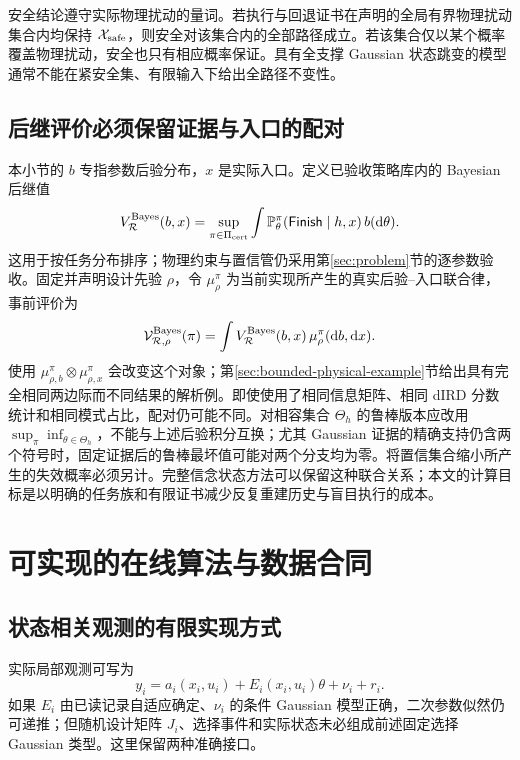\documentclass[UTF8,fontset=fandol,zihao=5,a4paper]{ctexart}
\newcommand{\dd}{\mathrm d}\newcommand{\given}{\,|\,}
\theoremstyle{definition}
\theoremstyle{remark}\newtheorem{remark}[theorem]{说明}
\numberwithin{equation}{section}
\begin{document}
安全结论遵守实际物理扰动的量词。若执行与回退证书在声明的全局有界物理扰动集合内均保持 $\mathcal X_{\rm safe}$，则安全对该集合内的全部路径成立。若该集合仅以某个概率覆盖物理扰动，安全也只有相应概率保证。具有全支撑 Gaussian 状态跳变的模型通常不能在紧安全集、有限输入下给出全路径不变性。

\subsection{后继评价必须保留证据与入口的配对}
本小节的 $b$ 专指参数后验分布，$x$ 是实际入口。定义已验收策略库内的 Bayesian 后继值
\begin{equation}
V_{\mathcal R}^{\rm Bayes}(b,x)
=\sup_{\pi\in\Pi_{\rm cert}}
\int \Pp_\theta^\pi(\mathsf{Finish}\mid h,x)\,b(\dd\theta).
\end{equation}
这用于按任务分布排序；物理约束与置信管仍采用第\ref{sec:problem}节的逐参数验收。固定并声明设计先验 $\rho$，令 $\mu_\rho^\pi$ 为当前实现所产生的真实后验--入口联合律，事前评价为
\begin{equation}
\mathcal V_{\mathcal R,\rho}^{\rm Bayes}(\pi)
=\int V_{\mathcal R}^{\rm Bayes}(b,x)\,\mu_\rho^\pi(\dd b,\dd x).
\label{eq:joint-value73}
\end{equation}
使用 $\mu_{\rho,b}^\pi\otimes\mu_{\rho,x}^\pi$ 会改变这个对象；第\ref{sec:bounded-physical-example}节给出具有完全相同两边际而不同结果的解析例。即使使用了相同信息矩阵、相同 dIRD 分数统计和相同模式占比，配对仍可能不同。对相容集合 $\Theta_h$ 的鲁棒版本应改用 $\sup_\pi\inf_{\theta\in\Theta_h}$，不能与上述后验积分互换；尤其 Gaussian 证据的精确支持仍含两个符号时，固定证据后的鲁棒最坏值可能对两个分支均为零。将置信集合缩小所产生的失效概率必须另计。完整信念状态方法可以保留这种联合关系；本文的计算目标是以明确的任务族和有限证书减少反复重建历史与盲目执行的成本。

\section{可实现的在线算法与数据合同}
\label{sec:algorithm73}

\subsection{状态相关观测的有限实现方式}
实际局部观测可写为
\begin{equation}
y_i=a_i(x_i,u_i)+E_i(x_i,u_i)\theta+\nu_i+r_i.
\end{equation}
如果 $E_i$ 由已读记录自适应确定、$\nu_i$ 的条件 Gaussian 模型正确，二次参数似然仍可递推；但随机设计矩阵 $J_i$、选择事件和实际状态未必组成前述固定选择 Gaussian 类型。这里保留两种准确接口。
\end{document}
